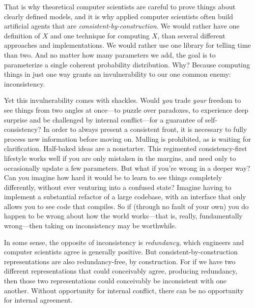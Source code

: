 That is why theoretical computer scientists are careful to prove things about clearly defined models,
and it is why applied computer scientists often build artificial agents that are \emph{consistent-by-construction}.
%
We would rather have one definition of $X$ and one technique for computing $X$, than several different approaches and implementations. 
We would rather use one library for telling time than two. 
And no matter how many parameters we add, the goal is to parameterize a single coherent probability distribution. 
%
Why? Because computing things in just one way grants an invulnerability to our one common enemy: inconsistency.

Yet this invulnerability comes with shackles.
Would \emph{you} trade \emph{your} freedom to see things from two angles at once---to puzzle over paradoxes, to experience deep surprise and be challenged by internal conflict---for a guarantee of self-consistency?
%
In order to always present a consistent front, it is necessary to fully process new information before moving on. Mulling is prohibited, as
is waiting for clarification.
Half-baked ideas are a nonstarter.
This regimented consistency-first lifestyle works well if you are only mistaken in the margins, and need only to occasionally update a few parameters.
But what if you're wrong in a deeper way?
Can you imagine how hard it would be to learn to see things completely differently, without ever venturing into a confused state?
Imagine having to implement a substantial refactor of a large codebase, with an interface that only allows you to see code that compiles.
So if (through no fault of your own) you do happen to be wrong about how the world works---that is, really, fundamentally wrong---then taking on inconsistency may be worthwhile.


In some sense, the opposite of inconsistency is \emph{redundancy}, which engineers and computer scientists agree is generally positive. 
But consistent-by-construction representations are also redundancy-free, by construction. 
For if we have two different representations that could conceivably agree, producing redundancy, then those two representations could conceivably be inconsistent with one another. 
Without opportunity for internal conflict, there can be no opportunity for internal agreement. 

